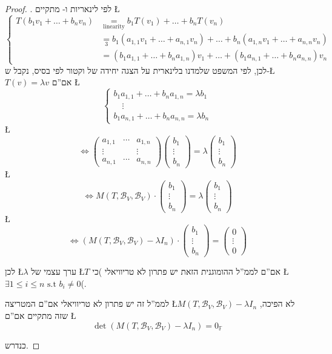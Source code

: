 \documentclass[english,hebrew]{article}
\theoremstyle{plain}
\begin{document}
\begin{proof}
{\endL}. לפי לינאריות ו-{\endL} מתקיים \L{%
\[
\begin{cases}
T\left(b_{1}v_{1}+\dots+b_{n}v_{n}\right) & \underset{\text{linearity}}{=}b_{1}T(v_{1})+\dots+b_{n}T(v_{n})\\
 & \underset{3}{=}b_{1}(a_{1,1}v_{1}+\dots+a_{n,1}v_{n})+\dots+b_{n}(a_{1,n}v_{1}+\dots+a_{n,n}v_{n})\\
 & =\left(b_{1}a_{1,1}+\dots+b_{n}a_{1,n}\right)v_{1}+\dots+\left(b_{1}a_{n,1}+\dots+b_{n}a_{n,n}\right)v_{n}
\end{cases}
\]
}%
לכן, לפי המשפט שלמדנו בלינארית {\endL} על הצגה יחידה של וקטור
לפי בסיס, נקבל ש-\L{$T(v)=\lambda v$} אם\textquotedblright ם \L{%
\[
\begin{cases}
b_{1}a_{1,1}+\dots+b_{n}a_{1,n}=\lambda b_{1}\\
\quad\vdots\\
b_{1}a_{n,1}+\dots+b_{n}a_{n,n}=\lambda b_{n}
\end{cases}
\]
}%
\L{%
\[
\iff\begin{pmatrix}a_{1,1} & \cdots & a_{1,n}\\
\vdots &  & \vdots\\
a_{n,1} & \cdots & a_{n,n}
\end{pmatrix}\begin{pmatrix}b_{1}\\
\vdots\\
b_{n}
\end{pmatrix}=\lambda\begin{pmatrix}b_{1}\\
\vdots\\
b_{n}
\end{pmatrix}
\]
}%
\L{%
\[
\iff M(T,\mathcal{B}_{V},\mathcal{B}_{V})\cdot\begin{pmatrix}b_{1}\\
\vdots\\
b_{n}
\end{pmatrix}=\lambda\begin{pmatrix}b_{1}\\
\vdots\\
b_{n}
\end{pmatrix}
\]
}%
\L{%
\[
\iff\left(M(T,\mathcal{B}_{V},\mathcal{B}_{V})-\lambda I_{n}\right)\cdot\begin{pmatrix}b_{1}\\
\vdots\\
b_{n}
\end{pmatrix}=\begin{pmatrix}0\\
\vdots\\
0
\end{pmatrix}
\]
}%

לכן \L{$\lambda$} ערך עצמי של \L{$T$} אם\textquotedblright ם לממ\textquotedblright ל
ההומוגנית הזאת יש פתרון לא טריוויאלי )כי \L{$\exists1\le i\le n\text{ s.t }b_{i}\ne0$}(.

לממ\textquotedblright ל זה יש פתרון לא טריוויאלי אם\textquotedblright ם
המטריצה \L{$M(T,\mathcal{B}_{V},\mathcal{B}_{V})-\lambda I_{n}$}
לא הפיכה, שזה מתקיים אם\textquotedblright ם \L{%
\[
\det\left(M(T,\mathcal{B}_{V},\mathcal{B}_{V})-\lambda I_{n}\right)=0_{\mathbb{F}}
\]
}%

כנדרש.
\end{proof}
\end{document}

